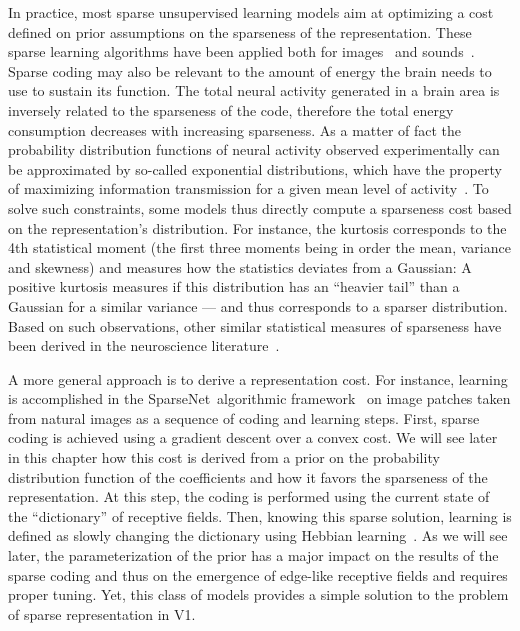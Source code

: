 \documentclass[a4paper, 11pt]{book}
\newcommand{\sparsenet}{{\sc SparseNet}}%
\begin{document}
In practice, most sparse unsupervised learning models aim at optimizing
a cost defined on prior assumptions on the sparseness of the representation.
These sparse learning algorithms have been applied both for images~\citep{Fyfe95,Olshausen96,Zibulevsky01,Perrinet03ieee,Rehn07,Doi07,Perrinet10shl}
and sounds~\citep{Lewicki00,Smith06}.
Sparse coding may also be relevant to the amount of energy the brain needs to use to sustain its function.
The total neural activity generated in a brain area is
inversely related to the sparseness of the code, therefore the total energy consumption decreases with increasing sparseness.
As a matter of fact the probability distribution functions of neural activity observed experimentally can be approximated by so-called exponential distributions, %
which have the property of maximizing information transmission for a given mean level of activity~\citep{Baddeley97}.
To solve such constraints, some models thus directly compute a sparseness cost based on the representation's distribution.
For instance, the kurtosis corresponds to the 4th statistical moment (the first three moments being in order the mean, variance and skewness)
and  measures how the statistics deviates from a Gaussian:
A positive kurtosis measures if this distribution has an ``heavier tail'' than a Gaussian for a similar variance --- and thus corresponds to a sparser distribution. Based  on such observations, other similar statistical measures of sparseness have been derived in the neuroscience literature~\citep{Vinje00}. %

A more general approach is to derive a representation cost.
For instance, learning is accomplished in the \sparsenet\ algorithmic framework~\citep{Olshausen97}
on image patches taken from natural images as a sequence of coding and learning steps.
First, sparse coding is achieved using a gradient descent over a convex cost.
We will see later in this chapter how this cost is derived from a prior  on the probability distribution function of the coefficients and how it favors the sparseness of the representation.
At this step, the coding is performed using the current state of the ``dictionary'' of receptive fields.
Then, knowing this sparse solution,
learning is defined as slowly changing the dictionary using Hebbian learning~\citep{Hebb49}.
As we will see later, the parameterization of the prior
has a major impact on the results of the sparse coding and
thus on the emergence of edge-like receptive fields and requires proper tuning.
Yet, this class of models provides a simple solution to the problem of sparse representation in V1.
\end{document}
